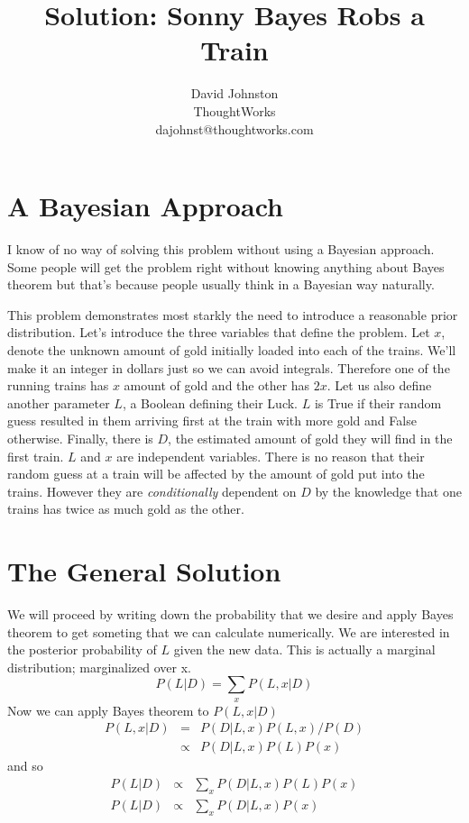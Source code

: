 \documentclass[12pt]{article}
\begin{document}
\title{Solution: Sonny Bayes Robs a Train} 
\author{David Johnston \\ThoughtWorks\\dajohnst@thoughtworks.com}
\maketitle

\section{A Bayesian Approach}

I know of no way of solving this problem without using a Bayesian approach. Some people will
get the problem right without knowing anything about Bayes theorem but that's because people
usually think in a Bayesian way naturally. 

This problem demonstrates most starkly the need to introduce a reasonable prior distribution. 
Let's introduce the three variables that define the problem. Let $x$, denote the unknown amount of gold initially 
loaded into each of the trains. We'll make it an integer in dollars just so we can avoid integrals. 
Therefore one of the running trains has $x$ amount of gold and the other has $2x$. 
Let us also define another parameter $L$, a Boolean defining their Luck. $L$ is True if their random guess resulted
in them arriving first at the train with more gold and False otherwise. Finally, there is $D$, the estimated
amount of gold they will find in the first train. $L$ and $x$ are independent variables. There is no reason that
their random guess at a train will be affected by the amount of gold put into the trains. 
However they are \emph{conditionally} dependent on $D$ by the knowledge that one trains has twice as
much gold as the other. 

\section{The General Solution}

We will proceed by writing down the probability that we desire and apply Bayes theorem to get someting that
we can calculate numerically. We are interested in the posterior probability of $L$ given the new data. This is 
actually a marginal distribution; marginalized over x.
\begin{equation}
P(L | D) = \sum_x P(L, x | D)
\end{equation}
Now we can apply Bayes theorem to $P(L,x | D)$
\begin{eqnarray}
P(L, x | D) &=& P(D | L, x) P(L,x) / P(D)\\
&\propto& P(D | L, x) P(L) P(x)
\end{eqnarray}
and so 
\begin{eqnarray}
P(L | D) & \propto &\sum_x P(D | L, x) P(L) P(x) \\
P(L | D) & \propto &\sum_x P(D | L, x) P(x)
\end{eqnarray}
\end{document}
